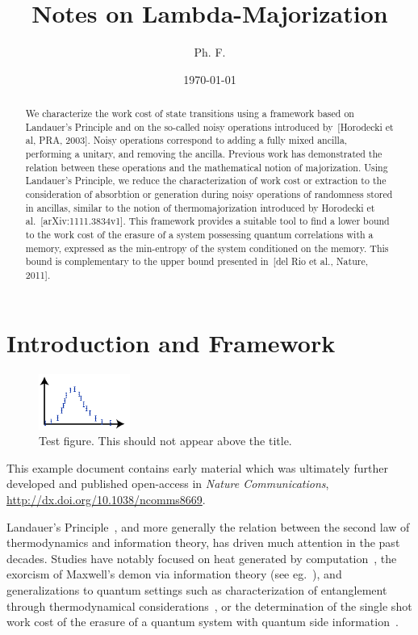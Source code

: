 \documentclass[10pt,letterpaper]{article}
\title{Notes on Lambda-Majorization}
\author{Ph. F.}
\date{\today}
\theoremstyle{plain}
\begin{document}
\maketitle

\begin{abstract}
  We characterize the work cost of state transitions using a framework based on Landauer's Principle and
  on the so-called noisy operations introduced by~[Horodecki et al, PRA, 2003]. Noisy operations correspond to
  adding a fully mixed ancilla, performing a unitary, and removing the ancilla. Previous work has demonstrated
  the relation between these operations and the mathematical notion of majorization. Using Landauer's Principle,
  we reduce the characterization of work cost or extraction to the consideration of absorbtion or generation
  during noisy operations of randomness stored in ancillas, similar to the notion of thermomajorization introduced
  by Horodecki et al.~[arXiv:1111.3834v1]. This framework provides a
  suitable tool to find a lower bound to the work cost of the erasure of a system possessing quantum
  correlations with a memory, expressed as the min-entropy of the system conditioned on the memory. This
  bound is complementary to the upper bound presented in~[del Rio et al., Nature, 2011].
\end{abstract}


\inlinetoc

\section{Introduction and Framework}

\begin{figure}[t]
  \centering
  \includegraphics[width=3cm]{testfigure}
  \caption{Test figure. This should not appear above the title.}
  \label{fig:test}
\end{figure}

This example document contains early material which was ultimately further developed and
published open-access in \emph{Nature Communications},
\url{http://dx.doi.org/10.1038/ncomms8669}.

Landauer's Principle~\cite{Landauer1961_5392446Erasure}, and more generally the relation between the second law
of thermodynamics and information theory, has driven much attention in the past decades. Studies have notably
focused on heat generated by computation~\cite{Bennett1982IJTP_ThermodynOfComp}, the exorcism of Maxwell's demon
via information theory (see eg.~\cite{Bennett2003_NotesLP}), and generalizations to quantum settings such as
characterization of entanglement through thermodynamical
considerations~\cite{Oppenheim2002PRL_thermodynamical}, or the determination of the single shot work cost of
the erasure of a quantum system with quantum side information~\cite{delRio2011Nature}.
\end{document}

